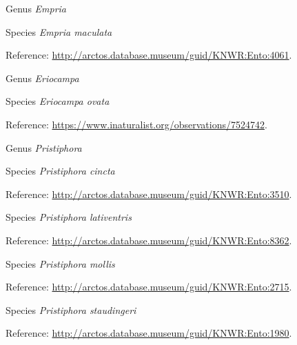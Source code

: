 \documentclass[9pt, article]{memoir}
\begin{document}
\begin{multicols}{2}
\vspace{6pt}\noindent\hspace{30pt}Genus \textit{Empria}


\vspace{6pt}\noindent\hspace{36pt}Species \textit{Empria maculata}


\vspace{6pt}Reference: 
\url{http://arctos.database.museum/guid/KNWR:Ento:4061}.

\vspace{6pt}\noindent\hspace{30pt}Genus \textit{Eriocampa}


\vspace{6pt}\noindent\hspace{36pt}Species \textit{Eriocampa ovata}


\vspace{6pt}Reference: 
\url{https://www.inaturalist.org/observations/7524742}.

\vspace{6pt}\noindent\hspace{30pt}Genus \textit{Pristiphora}


\vspace{6pt}\noindent\hspace{36pt}Species \textit{Pristiphora cincta}


\vspace{6pt}Reference: 
\url{http://arctos.database.museum/guid/KNWR:Ento:3510}.

\vspace{6pt}\noindent\hspace{36pt}Species \textit{Pristiphora lativentris}


\vspace{6pt}Reference: 
\url{http://arctos.database.museum/guid/KNWR:Ento:8362}.

\vspace{6pt}\noindent\hspace{36pt}Species \textit{Pristiphora mollis}


\vspace{6pt}Reference: 
\url{http://arctos.database.museum/guid/KNWR:Ento:2715}.

\vspace{6pt}\noindent\hspace{36pt}Species \textit{Pristiphora staudingeri}


\vspace{6pt}Reference: 
\url{http://arctos.database.museum/guid/KNWR:Ento:1980}.


\end{multicols}
\end{document}
